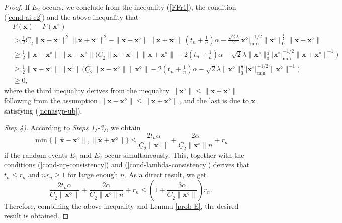 \documentclass{article}
\numberwithin{equation}{section}
\begin{document}
\begin{proof}
	

	If $E_2$ occurs, we conclude from the inequality (\ref{FFr1}), the condition (\ref{cond-ai-c2}) and the above inequality that
	\begin{equation}
		\begin{aligned}
			&F(\mathbf{x})-F(\mathbf{x}^\diamond)\\
			&>\frac{1}{2}\underline{C}_2\|\mathbf{x}-\mathbf{x}^\diamond\|^2\|\mathbf{x}+\mathbf{x}^\diamond\|^2-\|\mathbf{x}-\mathbf{x}^\diamond\|\|\mathbf{x}+\mathbf{x}^\diamond\|(t_n+\frac{1}{n})\alpha
			-\frac{\sqrt{2}\lambda}{2}|\mathbf{x}^\diamond|_{\mathrm{min}}^{-1/2}\|\mathbf{x}^\diamond\|_0^{\frac{1}{2}}\|\mathbf{x}-\mathbf{x}^\diamond\|\\
			&\geq\frac{1}{2}\|\mathbf{x}-\mathbf{x}^\diamond\|\|\mathbf{x}+\mathbf{x}^\diamond\|\Big(\underline{C}_2\|\mathbf{x}-\mathbf{x}^\diamond\|\|\mathbf{x}+\mathbf{x}^\diamond\|
			-2(t_n+\frac{1}{n})\alpha
			-\sqrt{2}\lambda\|\mathbf{x}^\diamond\|_0^{\frac{1}{2}}|\mathbf{x}^\diamond|_{\mathrm{min}}^{-1/2}
			\|\mathbf{x}+\mathbf{x}^\diamond\|^{-1}\Big)\\
			&\geq\frac{1}{2}\|\mathbf{x}-\mathbf{x}^\diamond\|\|\mathbf{x}^\diamond\|\Big(\underline{C}_2\|\mathbf{x}-\mathbf{x}^\diamond\|\|\mathbf{x}^\diamond\|-2(t_n+\frac{1}{n})\alpha
			-\sqrt{2}\lambda\|\mathbf{x}^\diamond\|_0^{\frac{1}{2}}|\mathbf{x}^\diamond|_{\mathrm{min}}^{-1/2}\|\mathbf{x}^\diamond\|^{-1}
			\Big)\\
			&\geq 0,
		\end{aligned}\nonumber
	\end{equation}
	where the third inequality derives from the inequality $\|\mathbf{x}^\diamond\|\leq\|\mathbf{x}+\mathbf{x}^\diamond\|$ following from the assumption $\|\mathbf{x}-\mathbf{x}^\diamond\|\leq\|\mathbf{x}+\mathbf{x}^\diamond\|$, and the last is due to  $\mathbf{x}$ satisfying (\ref{nonasyp-ub}).

	
	
		\textit{Step 4)}. According to  \textit{Steps 1)-3)},  we obtain  
	$$\min\{\|\hat{\mathbf{x}}-\mathbf{x}^\diamond\|, \|\hat{\mathbf{x}}+\mathbf{x}^\diamond\|\}\leq\frac{2t_n\alpha}{\underline{C}_2\|\mathbf{x}^\diamond\|}+\frac{2\alpha}{\underline{C}_2\|\mathbf{x}^\diamond\|n}
	+r_n$$
	if the random events $E_1$ and $E_2$ occur simultaneously. 
This, together with the conditions (\ref{cond-np-consistency}) and (\ref{cond-lambda-consistency}) derives that $t_n\leq r_n$ and $nr_n\geq1$ for large enough $n$. As a direct result, we get 
	$$\frac{2t_n\alpha}{\underline{C}_2\|\mathbf{x}^\diamond\|}+\frac{2\alpha}{\underline{C}_2\|\mathbf{x}^\diamond\|n}
	+r_n\leq(1+\frac{3\alpha}{\underline{C}_2\|\mathbf{x}^\diamond\|})r_n.$$
Therefore, combining the above inequality and Lemma \ref{prob-E}, the desired result is obtained.
\end{proof}
\end{document}
